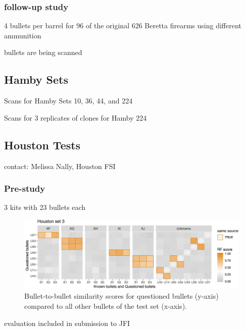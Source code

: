 \documentclass[]{book}
\begin{document}
\hypertarget{follow-up-study}{%
\subsubsection{follow-up study}\label{follow-up-study}}

4 bullets per barrel for 96 of the original 626 Beretta firearms using different ammunition

bullets are being scanned

\hypertarget{hamby-sets}{%
\subsection{Hamby Sets}\label{hamby-sets}}

Scans for Hamby Sets 10, 36, 44, and 224

Scans for 3 replicates of clones for Hamby 224

\hypertarget{houston-tests}{%
\subsection{Houston Tests}\label{houston-tests}}

contact: Melissa Nally, Houston FSI

\hypertarget{pre-study}{%
\subsubsection{Pre-study}\label{pre-study}}

3 kits with 23 bullets each

\begin{figure}

{\centering \includegraphics[width=58.11in]{images/heike/houston-pre-set3} 

}

\caption{Bullet-to-bullet similarity scores for questioned bullets (y-axis) compared to all other bullets of the test set (x-axis).}\label{fig:unnamed-chunk-5}
\end{figure}

evaluation included in submission to JFI
\end{document}
